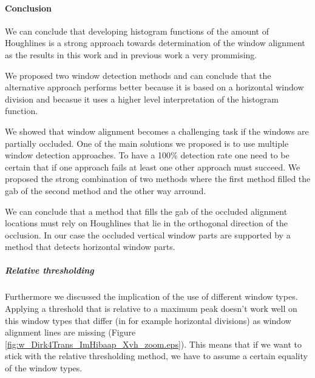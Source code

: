 
\paragraph{Conclusion}
We can conclude that developing histogram functions of the amount of Houghlines
is a strong approach towards determination of the window alignment as the
results in this work and in previous work a very prommising.

We proposed two window detection methods and can conclude that the alternative
approach performs better because it is based on a horizontal window division and
becasue it uses a higher level interpretation of the histogram function.

We showed that window alignment becomes a challenging task if the windows are partially
occluded.  One of the main solutions we proposed is to use multiple window
detection approaches.  To have a 100\% detection rate one need to be certain
that if one approach fails at least one other approach must succeed.  We
proposed the strong combination of two methods where the first method filled the
gab of the second method and the other way arround.

We can conclude that a method that fills the gab of the occluded alignment locations
must rely on Houghlines that lie in the orthogonal direction of the occlusion.
In our case the occluded vertical window parts are supported by a method that
detects horizontal window parts.

\subparagraph{Relative thresholding}
Furthermore we discussed the implication of the use of different window types.
Applying a threshold that is relative to a maximum peak doesn't work well on
this window types that differ (in for example horizontal divisions) as window
alignment lines are missing (Figure
\ref{fig:w_Dirk4Trans_ImHibaap_Xvh_zoom.eps}).  This means that if we want to
stick with the relative thresholding method, we have to assume a certain
equality of the window types. 





